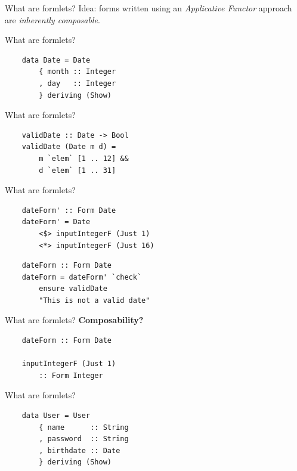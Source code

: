 \documentclass[20pt]{beamer}
\newcommand{\vspaced}{
    \vspace{5mm}
}
\begin{document}
\begin{frame}{What are formlets?}
    Idea: forms written using an \emph{Applicative Functor} approach are
    \emph{inherently composable}.
\end{frame}

\begin{frame}[fragile]{What are formlets?}
    \begin{lstlisting}
    data Date = Date
        { month :: Integer
        , day   :: Integer
        } deriving (Show)
    \end{lstlisting}
\end{frame}

\begin{frame}[fragile]{What are formlets?}
    \begin{lstlisting}
    validDate :: Date -> Bool
    validDate (Date m d) =
        m `elem` [1 .. 12] &&
        d `elem` [1 .. 31]
    \end{lstlisting}
\end{frame}

\begin{frame}[fragile]{What are formlets?}
    \begin{lstlisting}
    dateForm' :: Form Date
    dateForm' = Date
        <$> inputIntegerF (Just 1)
        <*> inputIntegerF (Just 16)
    \end{lstlisting}
    \begin{lstlisting}
    dateForm :: Form Date
    dateForm = dateForm' `check`
        ensure validDate
        "This is not a valid date"
    \end{lstlisting}
\end{frame}

\begin{frame}[fragile]{What are formlets?}
    \textbf{Composability?} \\
    \vspaced
    \begin{lstlisting}
    dateForm :: Form Date

    inputIntegerF (Just 1)
        :: Form Integer
    \end{lstlisting}
\end{frame}

\begin{frame}[fragile]{What are formlets?}
    \begin{lstlisting}
    data User = User
        { name      :: String
        , password  :: String
        , birthdate :: Date
        } deriving (Show)
    \end{lstlisting}
\end{frame}
\end{document}
